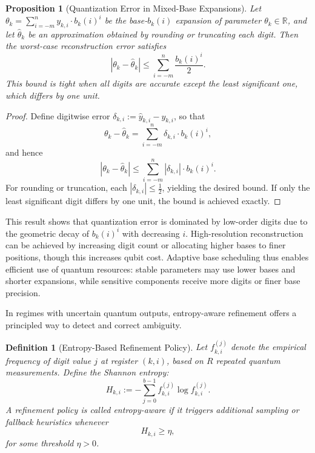 \documentclass[aps,twocolumn,superscriptaddress,nofootinbib]{revtex4}
\newtheorem{proposition}{Proposition}
\newtheorem{definition}{Definition}
\begin{document}
\begin{proposition}[Quantization Error in Mixed-Base Expansions]
Let \( \theta_k = \sum_{i = -m}^{n} y_{k,i} \cdot b_k(i)^i \) be the base-$b_k(i)$ expansion of parameter \( \theta_k \in \mathbb{R} \), and let \( \hat{\theta}_k \) be an approximation obtained by rounding or truncating each digit. Then the worst-case reconstruction error satisfies
\begin{equation}
|\theta_k - \hat{\theta}_k| \leq \sum_{i = -m}^{n} \frac{b_k(i)^i}{2}.
\end{equation}
This bound is tight when all digits are accurate except the least significant one, which differs by one unit.
\end{proposition}

\begin{proof}
Define digitwise error \( \delta_{k,i} := \hat{y}_{k,i} - y_{k,i} \), so that
\[
\theta_k - \hat{\theta}_k = \sum_{i=-m}^n \delta_{k,i} \cdot b_k(i)^i,
\]
and hence
\[
|\theta_k - \hat{\theta}_k| \leq \sum_{i = -m}^n |\delta_{k,i}| \cdot b_k(i)^i.
\]
For rounding or truncation, each \( |\delta_{k,i}| \leq \frac{1}{2} \), yielding the desired bound. If only the least significant digit differs by one unit, the bound is achieved exactly.
\end{proof}

This result shows that quantization error is dominated by low-order digits due to the geometric decay of \( b_k(i)^i \) with decreasing \( i \). High-resolution reconstruction can be achieved by increasing digit count or allocating higher bases to finer positions, though this increases qubit cost. Adaptive base scheduling thus enables efficient use of quantum resources: stable parameters may use lower bases and shorter expansions, while sensitive components receive more digits or finer base precision.

In regimes with uncertain quantum outputs, entropy-aware refinement offers a principled way to detect and correct ambiguity.

\begin{definition}[Entropy-Based Refinement Policy]
Let \( f^{(j)}_{k,i} \) denote the empirical frequency of digit value \( j \) at register \( (k, i) \), based on \( R \) repeated quantum measurements. Define the Shannon entropy:
\[
H_{k,i} := -\sum_{j = 0}^{b - 1} f^{(j)}_{k,i} \log f^{(j)}_{k,i}.
\]
A refinement policy is called entropy-aware if it triggers additional sampling or fallback heuristics whenever
\[
H_{k,i} \geq \eta,
\]
for some threshold \( \eta > 0 \).
\end{definition}
\end{document}
